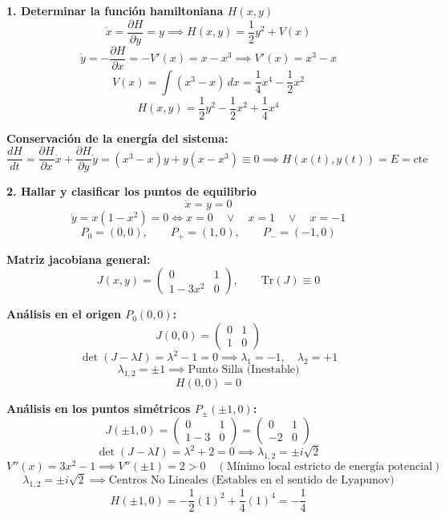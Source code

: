 \documentclass[11pt,a4paper]{article}
\newenvironment{solucion}[1][Solución Detallada]{%
    \vspace{1.5mm}%
    \noindent{\large\textbf{Solución:}}\par\vspace{1.5mm}%
}{%
    \par\vspace{3mm}%
}
\begin{document}
\begin{solucion}

\textbf{\large 1. Determinar la función hamiltoniana $H(x, y)$}
\[
\dot{x} = \frac{\partial H}{\partial y} = y \implies H(x, y) = \frac{1}{2}y^2 + V(x)
\]
\[
\dot{y} = -\frac{\partial H}{\partial x} = -V'(x) = x - x^3 \implies V'(x) = x^3 - x
\]
\[
V(x) = \int (x^3 - x)\, dx = \frac{1}{4}x^4 - \frac{1}{2}x^2
\]
\[
\boxed{H(x, y) = \frac{1}{2}y^2 - \frac{1}{2}x^2 + \frac{1}{4}x^4}
\]

\textbf{Conservación de la energía del sistema:}
\[
\frac{dH}{dt} = \frac{\partial H}{\partial x}\dot{x} + \frac{\partial H}{\partial y}\dot{y} = (x^3 - x)y + y(x - x^3) \equiv 0 \implies \boxed{H(x(t), y(t)) = E = \text{cte}}
\]

\vspace{3.5mm}

\textbf{\large 2. Hallar y clasificar los puntos de equilibrio}
\[
\dot{x} = y = 0
\]
\[
\dot{y} = x(1 - x^2) = 0 \iff x = 0 \quad \lor \quad x = 1 \quad \lor \quad x = -1
\]
\[
\boxed{P_0 = (0, 0), \qquad P_+ = (1, 0), \qquad P_- = (-1, 0)}
\]

\textbf{Matriz jacobiana general:}
\[
J(x, y) = \begin{pmatrix} 0 & 1 \\ 1 - 3x^2 & 0 \end{pmatrix}, \qquad \mathrm{Tr}(J) \equiv 0
\]

\textbf{Análisis en el origen $P_0(0, 0)$:}
\[
J(0, 0) = \begin{pmatrix} 0 & 1 \\ 1 & 0 \end{pmatrix}
\]
\[
\det(J - \lambda I) = \lambda^2 - 1 = 0 \implies \lambda_1 = -1, \quad \lambda_2 = +1
\]
\[
\boxed{\lambda_{1,2} = \pm 1 \implies \text{Punto Silla (Inestable)}}
\]
\[
\boxed{H(0, 0) = 0}
\]

\textbf{Análisis en los puntos simétricos $P_{\pm}(\pm 1, 0)$:}
\[
J(\pm 1, 0) = \begin{pmatrix} 0 & 1 \\ 1 - 3 & 0 \end{pmatrix} = \begin{pmatrix} 0 & 1 \\ -2 & 0 \end{pmatrix}
\]
\[
\det(J - \lambda I) = \lambda^2 + 2 = 0 \implies \lambda_{1,2} = \pm i\sqrt{2}
\]
\[
V''(x) = 3x^2 - 1 \implies V''(\pm 1) = 2 > 0 \quad (\text{Mínimo local estricto de energía potencial})
\]
\[
\boxed{\lambda_{1,2} = \pm i\sqrt{2} \implies \text{Centros No Lineales (Estables en el sentido de Lyapunov)}}
\]
\[
\boxed{H(\pm 1, 0) = -\frac{1}{2}(1)^2 + \frac{1}{4}(1)^4 = -\frac{1}{4}}
\]


\end{solucion}
\end{document}
